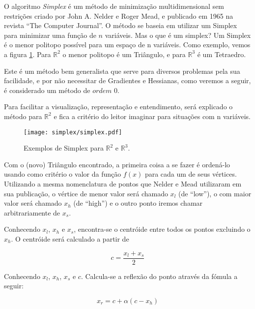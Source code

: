 O algoritmo \textit{Simplex} é um método de minimização multidimensional 
sem restrições criado por John A. Nelder e Roger Mead, e publicado em 1965 na revista ``The Computer Journal''.
O método se baseia em utilizar um Simplex para minimizar uma função de $n$ variáveis. 
Mas o que é um simplex? Um Simplex é o menor politopo possível para um espaço de n variáveis. Como exemplo, vemos a figura \ref{fig:simplex}. Para $\mathbb{R}^2$ o menor politopo é um Triângulo, e para $\mathbb{R}^3$ é um Tetraedro.

Este é um método bem generalista que serve para diversos problemas pela sua facilidade, e por não necessitar de Gradientes e Hessianas, como veremos a seguir, é considerado um método de $ordem$ $0$. 

Para facilitar a visualização, representação e entendimento, será explicado o método para $\mathbb{R}^2$ e fica a critério do leitor imaginar para situações com n variáveis.
\begin{figure}[h]
	\begin{center}	
		\texttt{[image: simplex/simplex.pdf]}
		\caption{Exemplos de Simplex para $\mathbb{R}^2$ e $\mathbb{R}^3$.}
		\label{fig:simplex}
	\end{center}
\end{figure}


Com o (novo) Triângulo encontrado, a primeira coisa a se fazer é ordená-lo usando como critério o valor da função $f(x)$ para cada um de seus vértices. Utilizando a mesma nomenclatura de pontos que Nelder e Mead utilizaram em sua publicação, o vértice de menor valor será chamado $x_l$ (de ``low''), o com maior valor será chamado $x_h$ (de ``high'') e o outro ponto iremos chamar arbitrariamente de $x_s$.



Conhecendo $x_l$, $x_h$ e $x_s$, encontra-se o centróide entre todos os pontos excluindo o $x_h$. O centróide será calculado a partir de

\begin{equation}
c=\dfrac{x_l+x_s}{2}
\end{equation}

\pagebreak
{}
Conhecendo $x_l$, $x_h$, $x_s$ e $c$. Calcula-se a reflexão do ponto através da fómula a seguir:

\begin{equation}
x_r=c+\alpha(c-x_h)
\end{equation}

